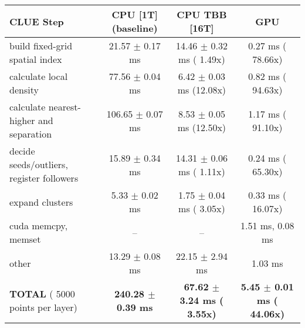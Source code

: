     \begin{tabular}{l|c|c|c}
    \hline
    CLUE Step                                 & CPU [1T] (baseline)         & CPU TBB [16T]                         & GPU                       \\ \hline
    build fixed-grid spatial index            &  21.57 $\pm$  0.17 ms       &  14.46 $\pm$  0.32 ms ( 1.49x)        &   0.27 ms ( 78.66x)       \\
    calculate local density                   &  77.56 $\pm$  0.04 ms       &   6.42 $\pm$  0.03 ms (12.08x)        &   0.82 ms ( 94.63x)       \\
    calculate nearest-higher and separation   & 106.65 $\pm$  0.07 ms       &   8.53 $\pm$  0.05 ms (12.50x)        &   1.17 ms ( 91.10x)       \\
    decide seeds/outliers, register followers &  15.89 $\pm$  0.34 ms       &  14.31 $\pm$  0.06 ms ( 1.11x)        &   0.24 ms ( 65.30x)       \\
    expand clusters                           &   5.33 $\pm$  0.02 ms       &   1.75 $\pm$  0.04 ms ( 3.05x)        &   0.33 ms ( 16.07x)       \\ \hline
    cuda memcpy, memset                       & --                          & --                                    &   1.51 ms,   0.08 ms      \\ 
    other                                     &  13.29 $\pm$  0.08 ms       &  22.15 $\pm$  2.94 ms                 &   1.03 ms                 \\ \hline
    \textbf{TOTAL} ( 5000 points per layer)   & \textbf{240.28 $\pm$  0.39 ms} & \textbf{ 67.62 $\pm$  3.24 ms ( 3.55x)} & \textbf{  5.45 $\pm$  0.01 ms ( 44.06x)}  \\
    \hline 
    \end{tabular}
    \linebreak


